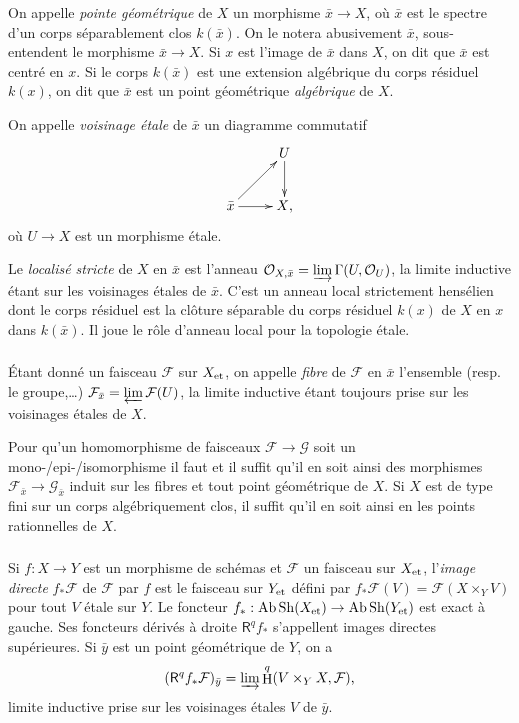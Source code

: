 \documentclass{book}
\DeclareMathOperator{\ab}{Ab}
\DeclareMathOperator{\h}{H}
\DeclareMathOperator{\sh}{Sh}
\newcommand{\cF}{\mathcal{F}}
\newcommand{\cG}{\mathcal{G}}
\newcommand{\cO}{\mathcal{O}}
\newcommand{\et}[1]{{#1}_{\textnormal{et}}}
\newcommand{\R}{\mathsf{R}}
\begin{document}
On appelle \emph{pointe géométrique} de $X$ un morphisme $\bar x\to X$, où 
$\bar x$ est le spectre d'un corps séparablement clos $k(\bar x)$. On le notera 
abusivement $\bar x$, sous-entendent le morphisme $\bar x\to X$. Si $x$ est 
l'image de $\bar x$ dans $X$, on dit que $\bar x$ est centré en $x$. Si le 
corps $k(\bar x)$ est une extension algébrique du corps résiduel $k(x)$, on dit 
que $\bar x$ est un point géométrique \emph{algébrique} de $X$. 

On appelle \emph{voisinage étale} de $\bar x$ un diagramme commutatif 
\[\xymatrix{
  & U \ar[d] \\
  \bar x \ar[ur] \ar[r] 
  & X\text{,}
}\]
où $U\to X$ est un morphisme étale. 

Le \emph{localisé stricte} de $X$ en $\bar x$ est l'anneau 
$\cO_{X,\bar x} = \varinjlim \Gamma(U,\cO_U)$, la limite inductive étant sur les 
voisinages étales de $\bar x$. C'est un anneau local strictement hensélien dont 
le corps résiduel est la clôture séparable du corps résiduel $k(x)$ de $X$ en 
$x$ dans $k(\bar x)$. Il joue le rôle d'anneau local pour la topologie étale. 





\subsubsection{}\label{I:2-3-2}

Étant donné un faisceau $\cF$ sur $\et X$, on appelle \emph{fibre} de $\cF$ en 
$\bar x$ l'ensemble (resp. le groupe,\dots) $\cF_{\bar x}=\varprojlim \cF(U)$, 
la limite inductive étant toujours prise sur les voisinages étales de  $X$. 

Pour qu'un homomorphisme de faisceaux $\cF\to \cG$ soit un 
mono-/epi-/isomorphisme il faut et il suffit qu'il en soit ainsi des morphismes 
$\cF_{\bar x}\to \cG_{\bar x}$ induit sur les fibres et tout point géométrique 
de $X$. Si $X$ est de type fini sur un corps algébriquement clos, il suffit 
qu'il en soit ainsi en les points rationnelles de $X$. 





\subsubsection{}\label{I:2-3-3}

Si $f:X\to Y$ est un morphisme de schémas et $\cF$ un faisceau sur $\et X$, 
l'\emph{image directe} $f_* \cF$ de $\cF$ par $f$ est le faisceau sur $\et Y$ 
défini par $f_* \cF(V) = \cF(X\times_Y V)$ pour tout $V$ étale sur $Y$. Le foncteur 
$f_*:\ab\sh(\et X)\to \ab\sh(\et Y)$ est exact à gauche. Ses foncteurs 
dérivés à droite $\R^q f_*$ s'appellent images directes supérieures. Si 
$\bar y$ est un point géométrique de $Y$, on a 
\[
  (\R^q f_* \cF)_{\bar y} = \varinjlim \h^q(V\times_Y X,\cF)\text{,}
\]
limite inductive prise sur les voisinages étales $V$ de $\bar y$. 
\end{document}
